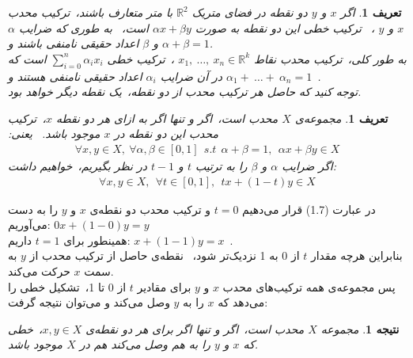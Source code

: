 \documentclass[12pt]{book}
\newtheorem{df}[thm]{\textbf{تعریف}}
\newtheorem{col}[thm]{\textbf{نتیجه}}
\begin{document}
	\begin{df}\label{Def5: Convex Combination}
		اگر 
		\( x \) و \( y \) 
		دو نقطه در فضای متریک
		 \( \mathbb{R}^2 \) 
		 با متر متعارف باشند،\  ترکیب محدب 
		\( x \) و \( y \)
		،\ ‌ ترکیب خطی این دو نقطه به صورت 
		\( \alpha x +‌\beta y \)
		 است،\ ‌ به طوری که ضرایب 
		 \( \alpha \) و \( \beta \)
		  اعداد حقیقی نامنفی باشند و 
		 \( \alpha +‌ \beta = 1 \).\\
		 به طور کلی،\ ترکیب محدب نقاط 
		 \( x_1,\ \ldots,\ x_n \in \mathbb{R}^k  \)
		 ،‌\ ترکیب خطی
		  \( \sum_{i = 0}^{n} \alpha_i x_i \)
		   است که در آن ضرایب 
		   \( \alpha_i \)
		    اعداد حقیقی نامنفی هستند و 
		    \( \alpha_1 +\ \ldots +\ \alpha_n = 1 \)\ . \\
		 توجه کنید که حاصل هر ترکیب محدب از دو نقطه،\ یک نقطه دیگر خواهد بود.
	\end{df}

	\begin{df}\label{Def6: Convex Set}
		مجموعه‌ی \( X \) محدب است،‌\ اگر و تنها اگر به ازای هر دو نقطه \( x \)،‌\ ترکیب محدب این دو نقطه در \( x \) موجود باشد. \ یعنی:
		\begin{align}
			\forall x, y \in X,\  \forall \alpha, \beta \in [0, 1] \ \  s.t \ \ \alpha +‌ \beta = 1, \ \  \alpha x +‌ \beta y \in X
		\end{align}
		اگر ضرایب \( \alpha \) و \( \beta \) را به ترتیب \( t \) و \( t-1 \) در نظر بگیریم،\ خواهیم داشت:
		\begin{align}
			\forall x, y \in X,\ \ \forall t \in [0,1], \ \ tx +‌(1-t)y \in X
		\end{align}
	\end{df}
	
	\noindent 
	در عبارت (1.7) قرار می‌دهیم
	  \( t = 0 \) 
	  و ترکیب محدب دو نقطه‌ی \( x \) و \( y \) را به دست می‌آوریم:
	   \(0x +‌ (1-0)y = y \) \\
	همینطور برای \( t = 1 \) داریم:
	 \( x +‌(1-1)y = x \)\ . \\
	بنابراین هرچه مقدار \( t \) از 0 به 1 نزدیک‌تر شود، \ نقطه‌ی حاصل از ترکیب محدب از \( y \) به سمت \( x \) حرکت می‌کند.\\
	پس مجموعه‌ی همه ترکیب‌های محدب \( x \) و \( y \) برای مقادیر \( t \) از 0 تا 1،\ تشکیل خطی را می‌دهد که \( x \) را به \( y \) وصل می‌کند و می‌توان نتیجه گرفت:
	\begin{col}\label{Col7: Geometric Consept of Convex Set}
		مجموعه \( X \) محدب است،\ اگر و تنها اگر برای هر دو نقطه‌ی \( x, y \in X\)،\ خطی که \( x \) و \( y \)  را به هم وصل می‌کند هم در \( X \) موجود باشد.
	\end{col}
\end{document}
